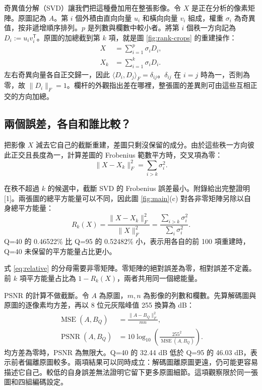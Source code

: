 \documentclass[12pt,a4paper,onecolumn]{article}
\begin{document}
奇異值分解（SVD）讓我們把這種疊加用在整張影像。令 $X$ 是正在分析的像素矩陣。原圖記為 $A$。第 $i$ 個外積由直向向量 $u_i$ 和橫向向量 $v_i$ 組成，權重 $\sigma_i$ 為奇異值，按非遞增順序排列。$p$ 是列數與欄數中較小者。將第 $i$ 個秩一方向記為 $D_i:=u_i v_i^{\mathsf T}$。原圖的加總截到第 $k$ 項，就是圖 \ref{fig:rank-crops} 的重建操作：
\begin{align}
 X &= \sum_{i=1}^{p}\sigma_i D_i, \label{eq:svd}\\
 X_k &= \sum_{i=1}^{k}\sigma_i D_i.
\end{align}
左右奇異向量各自正交歸一，因此 $\langle D_i,D_j\rangle_F=\delta_{ij}$。$\delta_{ij}$ 在 $i=j$ 時為一，否則為零，故 $\lVert D_i\rVert_F=1$。欄杆的外觀指出差在哪裡，整張圖的差異則可由這些互相正交的方向加總。

\begin{samepage}
\section{兩個誤差，各自和誰比較？}

把影像 $X$ 減去它自己的截斷重建，差圖只剩沒保留的成分。由於這些秩一方向彼此正交且長度為一，計算差圖的 Frobenius 範數平方時，交叉項為零：
\begin{equation}
 \lVert X-X_k\rVert_F^2=\sum_{i>k}\sigma_i^2 . \label{eq:tail}
\end{equation}
\end{samepage}
在秩不超過 $k$ 的候選中，截斷 SVD 的 Frobenius 誤差最小。附錄給出完整證明 [1]。兩張圖的總平方能量可以不同，因此圖 \ref{fig:main}(c) 對各非零矩陣另除以自身總平方能量：
\begin{equation}
 R_k(X)=\frac{\lVert X-X_k\rVert_F^2}{\lVert X\rVert_F^2}
       =\frac{\sum_{i>k}\sigma_i^2}{\sum_i\sigma_i^2}. \label{eq:relative}
\end{equation}
Q=40 的 0.46522\% 比 Q=95 的 0.52482\% 小，表示用各自的前 100 項重建時，Q=40 未保留的平方能量占比更小。

式 \eqref{eq:relative} 的分母需要非零矩陣。零矩陣的絕對誤差為零，相對誤差不定義。前 $k$ 項平方能量占比為 $1-R_k(X)$，兩者共用同一個總能量。

PSNR 的計算不做截斷。令 $A$ 為原圖，$m,n$ 為影像的列數和欄數。先算解碼圖與原圖的逐像素均方差，再以 8 位元灰階峰值 255 換算為 dB：
\begin{align}
 \operatorname{MSE}(A,B_Q)&=\frac{\lVert A-B_Q\rVert_F^2}{mn},\\
 \operatorname{PSNR}(A,B_Q)&=10\log_{10}\!\left(\frac{255^2}{\operatorname{MSE}(A,B_Q)}\right).
\end{align}
均方差為零時，PSNR 為無限大。Q=40 的 32.44 dB 低於 Q=95 的 46.03 dB，表示前者偏離原圖較多。兩項結果可以同時成立：解碼圖離原圖更遠，仍可能更容易描述它自己。較低的自身誤差無法證明它留下更多原圖細節。這項觀察限於同一張圖和四組編碼設定。
\end{document}
